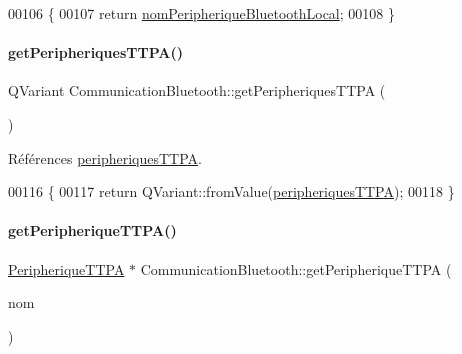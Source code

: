 \begin{DoxyCode}
00106 \{
00107     \textcolor{keywordflow}{return} \hyperlink{class_communication_bluetooth_a6781eed73c4b5db0fe7ff94c034f2cf5}{nomPeripheriqueBluetoothLocal};
00108 \}
\end{DoxyCode}
\mbox{\label{class_communication_bluetooth_a08f0efb9f8a5a9f0660aad870032b9d3}} 
\paragraph{\texorpdfstring{get\+Peripheriques\+T\+T\+P\+A()}{getPeripheriquesTTPA()}}
{\footnotesize\ttfamily Q\+Variant Communication\+Bluetooth\+::get\+Peripheriques\+T\+T\+PA (\begin{DoxyParamCaption}{ }\end{DoxyParamCaption})}



Références \hyperlink{class_communication_bluetooth_a656a80f8216d2a4db7cf2f865365e562}{peripheriques\+T\+T\+PA}.


\begin{DoxyCode}
00116 \{
00117     \textcolor{keywordflow}{return} QVariant::fromValue(\hyperlink{class_communication_bluetooth_a656a80f8216d2a4db7cf2f865365e562}{peripheriquesTTPA});
00118 \}
\end{DoxyCode}
\mbox{\label{class_communication_bluetooth_a1baec10cc16afe1a87cbad635a82c323}} 
\paragraph{\texorpdfstring{get\+Peripherique\+T\+T\+P\+A()}{getPeripheriqueTTPA()}}
{\footnotesize\ttfamily \hyperlink{class_peripherique_t_t_p_a}{Peripherique\+T\+T\+PA} $\ast$ Communication\+Bluetooth\+::get\+Peripherique\+T\+T\+PA (\begin{DoxyParamCaption}\item[{Q\+String}]{nom }\end{DoxyParamCaption})}



